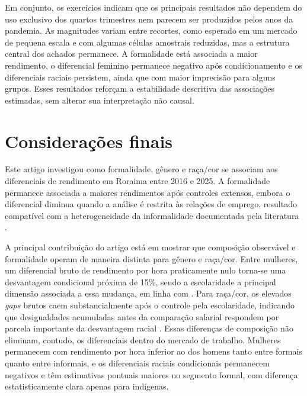 \documentclass[12pt,a4paper]{article}
\begin{document}
Em conjunto, os exercícios indicam que os principais resultados não dependem
do uso exclusivo dos quartos trimestres nem parecem ser produzidos pelos anos
da pandemia. As magnitudes variam entre recortes, como esperado em um mercado
de pequena escala e com algumas células amostrais reduzidas, mas a estrutura
central dos achados permanece. A formalidade está associada a maior rendimento,
o diferencial feminino permanece negativo após condicionamento e os
diferenciais raciais persistem, ainda que com maior imprecisão para alguns
grupos. Esses resultados reforçam a estabilidade descritiva das associações
estimadas, sem alterar sua interpretação não causal.

\section{Considerações finais}
\label{sec:conclusao}

Este artigo investigou como formalidade, gênero e raça/cor se associam aos
diferenciais de rendimento em Roraima entre 2016 e 2025. A formalidade
permanece associada a maiores rendimentos após controles extensos, embora o
diferencial diminua quando a análise é restrita às relações de emprego,
resultado compatível com a heterogeneidade da informalidade documentada pela
literatura \citep{curi2006, meghir2015, ulyssea2018}.

A principal contribuição do artigo está em mostrar que composição observável e
formalidade operam de maneira distinta para gênero e raça/cor. Entre mulheres,
um diferencial bruto de rendimento por hora praticamente nulo torna-se uma
desvantagem condicional próxima de 15\%, sendo a escolaridade a principal
dimensão associada a essa mudança, em linha com \citet{giuberti2005}. Para
raça/cor, os elevados \textit{gaps} brutos caem substancialmente após o controle
pela escolaridade, indicando que desigualdades acumuladas antes da comparação
salarial respondem por parcela importante da desvantagem racial
\citep{soares2000, campante2004}. Essas diferenças de composição não eliminam,
contudo, os diferenciais dentro do mercado de trabalho. Mulheres permanecem com
rendimento por hora inferior ao dos homens tanto entre formais quanto entre
informais, e os diferenciais raciais condicionais permanecem negativos e têm
estimativas pontuais maiores no segmento formal, com diferença estatisticamente
clara apenas para indígenas.
\end{document}
